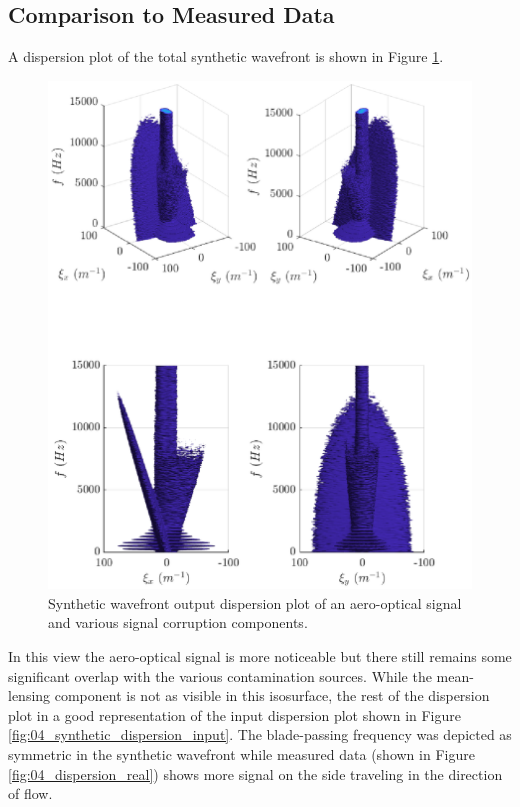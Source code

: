 \subsection{Comparison to Measured Data}
A dispersion plot of the total synthetic wavefront is shown in Figure \ref{fig:04_dispersion_synthetic}.
\begin{figure}
 \centering
 \includegraphics{../matlab/04_basic_filtering/dispersion_synthetic.eps}
 \caption{Synthetic wavefront output dispersion plot of an aero-optical signal and various signal corruption components.}
 \label{fig:04_dispersion_synthetic}
\end{figure}
In this view the aero-optical signal is more noticeable but there still remains some significant overlap with the various contamination sources.
While the mean-lensing component is not as visible in this isosurface, the rest of the dispersion plot in a good representation of the input dispersion plot shown in Figure \ref{fig:04_synthetic_dispersion_input}.
The blade-passing frequency was depicted as symmetric in the synthetic wavefront while measured data (shown in Figure \ref{fig:04_dispersion_real}) shows more signal on the side traveling in the direction of flow.
